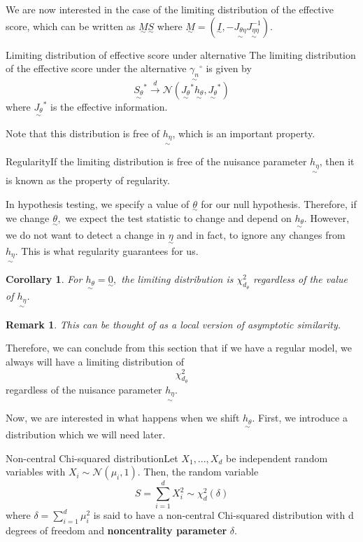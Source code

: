 \documentclass[twoside]{article}
\newtheorem{corollary}[theorem]{Corollary}
\newtheorem{remark}[theorem]{Remark}
\newcommand{\utilde}{\underset{\sim}}
\begin{document}
We are now interested in the case of the limiting distribution of the effective score, which can be written as $\utilde{M}\utilde{S}$ where $\utilde{M} = (\utilde{I}, -\utilde{J_{\theta \eta}}\utilde{J_{\eta \eta}^{-1}}).$

\begin{proposition_exam}{Limiting distribution of effective score under alternative}{} The limiting distribution of the effective score under the alternative $\utilde{\gamma_n}^{\circ}$ is given by 
$$
\utilde{S_{\theta}}^{*} \xrightarrow{d} \mathcal{N}(\utilde{J_{\theta}}^{*} \utilde{h_{\theta}}, \utilde{J_{\theta}}^*)
$$
where $\utilde{J_{\theta}}^*$ is the effective information.
\end{proposition_exam}

Note that this distribution is free of $\utilde{h_{\eta}}$, which is an important property.

\begin{definition_exam}{Regularity}{}If the limiting distribution is free of the nuisance parameter $\utilde{h_{\eta}}$, then it is known as the property of regularity.
\end{definition_exam}

In hypothesis testing, we specify a value of $\utilde{\theta}$ for our null hypothesis. Therefore, if we change $\utilde{\theta},$ we expect the test statistic to change and depend on $\utilde{h_{\theta}}.$ However, we do not want to detect a change in $\utilde{\eta}$ and in fact, to ignore any changes from $\utilde{h_{\eta}}.$ This is what regularity guarantees for us. 

\begin{corollary}For $\utilde{h_{\theta}} = \utilde{0},$ the limiting distribution is $\chi_{d_{\theta}}^{2}$ regardless of the value of $\utilde{h_{\eta}}$.
\end{corollary}
\begin{remark}This can be thought of as a local version of asymptotic similarity.
\end{remark}

Therefore, we can conclude from this section that if we have a regular model, we always will have a limiting distribution of $$\chi_{d_{\theta}}^{2}$$ regardless of the nuisance parameter $\utilde{h_{\eta}}.$

Now, we are interested in what happens when we shift $\utilde{h_{\theta}}.$ First, we introduce a distribution which we will need later.
\begin{definition_exam}{Non-central Chi-squared distribution}{}Let $X_1,...,X_d$ be independent random variables with $X_i \sim \mathcal{N}(\mu_i, 1)$. Then, the random variable 
$$
S = \sum_{i=1}^{d}X_i^2 \sim \chi_d^2(\delta)
$$
where $\delta = \sum_{i=1}^{d}\mu_i^2$ is said to have a non-central Chi-squared distribution with d degrees of freedom and \textbf{noncentrality parameter} $\delta.$
\end{definition_exam}
\end{document}

